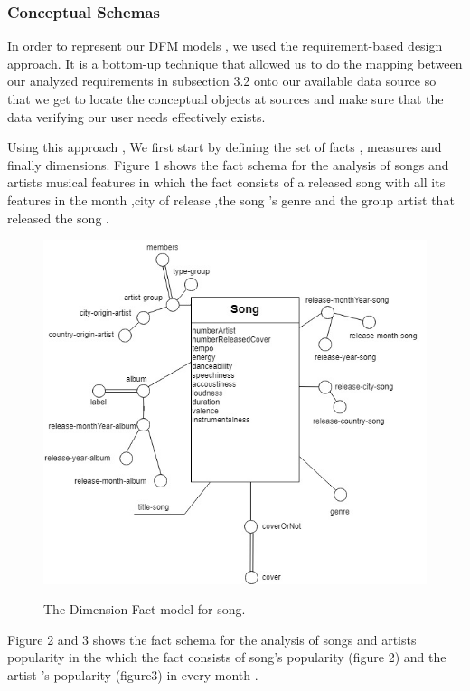 \documentclass[12pt]{article}
\begin{document}
\subsubsection{Conceptual Schemas}
In order to represent our DFM models , we used the requirement-based design approach. It is a bottom-up technique that allowed us to do the mapping between our analyzed requirements in subsection 3.2 onto our available data source so that we get to locate the conceptual objects at sources and make sure that the data verifying our user needs effectively exists.
~\par Using this approach , We first start by defining the set of facts , measures and finally dimensions.
Figure 1 shows the fact schema for the analysis of songs and artists musical features in which the fact consists of a released song with all its features in the month ,city of release ,the song 's genre and the group artist that released the song .
\begin{figure}[h]
    \centering
    \includegraphics[scale =0.5]{fct-song.jpg}\\[1 cm]
    \caption{The Dimension Fact model for song.}
    \label{fig:factSong}
\end{figure}
\newpage
Figure 2 and 3 shows the fact schema for the analysis of songs and artists popularity in the which the fact consists of song's popularity (figure 2) and the artist 's popularity (figure3)
in every month .
\end{document}
